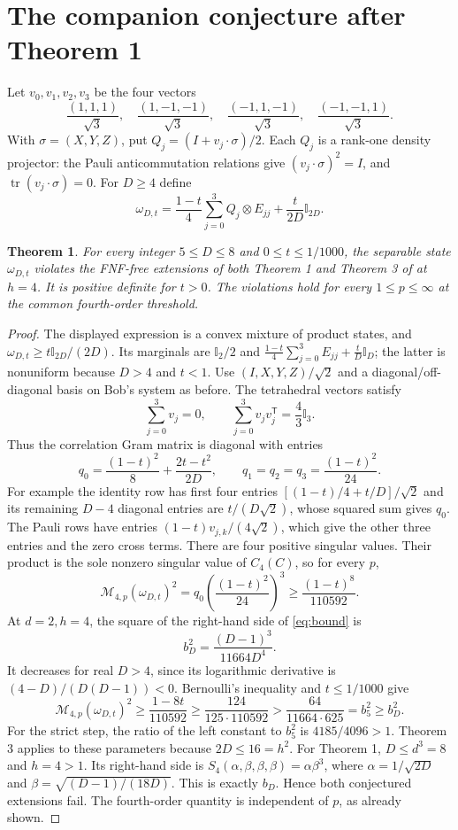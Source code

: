 \documentclass[11pt]{article}
\newtheorem{theorem}{Theorem}
\newcommand{\tr}{\operatorname{tr}}
\newcommand{\CM}{\mathcal M}
\newcommand{\Id}{\mathbb I}
\begin{document}
\section{The companion conjecture after Theorem 1}
Let $v_0,v_1,v_2,v_3$ be the four vectors
\[
 \frac{(1,1,1)}{\sqrt3},\quad
 \frac{(1,-1,-1)}{\sqrt3},\quad
 \frac{(-1,1,-1)}{\sqrt3},\quad
 \frac{(-1,-1,1)}{\sqrt3}.
\]
With $\sigma=(X,Y,Z)$, put $Q_j=(I+v_j\cdot\sigma)/2$.
Each $Q_j$ is a rank-one density projector: the Pauli anticommutation
relations give $(v_j\cdot\sigma)^2=I$, and $\tr(v_j\cdot\sigma)=0$.
For $D\ge4$ define
\[
 \omega_{D,t}=\frac{1-t}{4}\sum_{j=0}^3Q_j\otimes E_{jj}
             +\frac{t}{2D}\Id_{2D}.
\]
\begin{theorem}\label{thm:companion}
For every integer $5\le D\le8$ and $0\le t\le1/1000$, the separable
state $\omega_{D,t}$ violates the FNF-free extensions of both Theorem 1
and Theorem 3 of \cite{peled} at $h=4$.
It is positive definite for $t>0$. The violations hold for every
$1\le p\le\infty$ at the common fourth-order threshold.
\end{theorem}
\begin{proof}
The displayed expression is a convex mixture of product states, and
$\omega_{D,t}\ge t\Id_{2D}/(2D)$.
Its marginals are $\Id_2/2$ and
$\frac{1-t}{4}\sum_{j=0}^3E_{jj}+\frac{t}{D}\Id_D$;
the latter is nonuniform because $D>4$ and $t<1$.
Use $(I,X,Y,Z)/\sqrt2$ and a diagonal/off-diagonal basis on Bob's
system as before. The tetrahedral vectors satisfy
\[
 \sum_{j=0}^3 v_j=0,\qquad
 \sum_{j=0}^3v_jv_j^{\mathsf T}=\frac43\Id_3.
\]
Thus the correlation Gram matrix is diagonal with entries
\[
 q_0=\frac{(1-t)^2}{8}+\frac{2t-t^2}{2D},\qquad
 q_1=q_2=q_3=\frac{(1-t)^2}{24}.
\]
For example the identity row has first four entries
$[(1-t)/4+t/D]/\sqrt2$ and its remaining $D-4$ diagonal entries
are $t/(D\sqrt2)$, whose squared sum gives $q_0$.
The Pauli rows have entries $(1-t)v_{j,k}/(4\sqrt2)$,
which give the other three entries and the zero cross terms.
There are four positive singular values. Their product is the sole
nonzero singular value of $C_4(C)$, so for every $p$,
\[
 \CM_{4,p}(\omega_{D,t})^2
 =q_0\left(\frac{(1-t)^2}{24}\right)^3
 \ge\frac{(1-t)^8}{110592}.
\]
At $d=2,h=4$, the square of the right-hand side of \eqref{eq:bound} is
\[
 b_D^2=\frac{(D-1)^3}{11664D^4}.
\]
It decreases for real $D>4$, since its logarithmic derivative is
$(4-D)/(D(D-1))<0$. Bernoulli's inequality and $t\le1/1000$ give
\[
 \CM_{4,p}(\omega_{D,t})^2
 \ge\frac{1-8t}{110592}
 \ge\frac{124}{125\cdot110592}
 >\frac{64}{11664\cdot625}=b_5^2\ge b_D^2.
\]
For the strict step, the ratio of the left constant to $b_5^2$ is
$4185/4096>1$.
Theorem 3 applies to these parameters because $2D\le16=h^2$.
For Theorem 1, $D\le d^3=8$ and $h=4>1$. Its right-hand side
is $S_4(\alpha,\beta,\beta,\beta)=\alpha\beta^3$, where
$\alpha=1/\sqrt{2D}$ and $\beta=\sqrt{(D-1)/(18D)}$.
This is exactly $b_D$. Hence both conjectured extensions fail.
The fourth-order quantity is independent of $p$, as already shown.
\end{proof}
\end{document}
